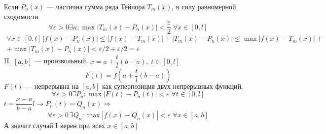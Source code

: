 \begin{greyEmpty}
	Если $ P_n(x) $ --- частична сумма ряда Тейлора $ T_m(x) $, в силу равномерной сходимости 
	\[
		\forall \varepsilon > 0 \exists n: \max |T_m(x) - P_n(x) | < \frac{\varepsilon}{2}\; \forall x \in [0,l]
	\]
	\begin{multline*}
		\forall x \in [0,l] \, |f(x) - P_n(x) | \leqslant |f(x) - T_m(x)| + |T_m(x) - P_n(x)| \leqslant \max |f(x) - T_m(x)| +\\+ \max |T_m(x) - P_n(x) | < \varepsilon/2 + \varepsilon/2 = \varepsilon
	\end{multline*}
	II. $ [a,b] $ --- произвольный. $ x = a + \dfrac{t}{l}(b-a),\; t \in [0,l] $
	\[		F(t) = f\left(a+\dfrac{t}{l}(b-a)\right) 
	\]
	$F(t) \text{ --- непрерывна на } [a,b]\text{ как суперпозиция двух непрерывных функций.} $
	\[
		\forall \varepsilon > 0 \exists P_n: \max |F(t) - P_n(t) | < \varepsilon \;\forall t \in [0,l]
	\]
	$ t = \dfrac{x-a}{b-a}l \rightarrow P_n(t) = Q_n(x) \Rightarrow $
	\[
		\forall \varepsilon > 0\, \exists Q_n: \max |f(x) - Q_n(x) | < \varepsilon\; \forall x \in [a,b]
	\]
	А значит случай I верен при всех $ x \in [a,b] $
\end{greyEmpty}